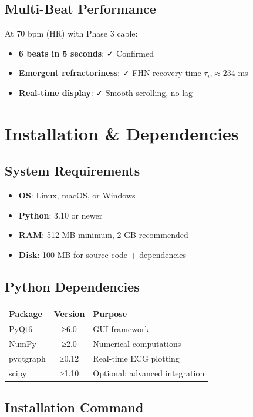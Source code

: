 \documentclass[11pt, a4paper]{article}
\begin{document}
\subsection{Multi-Beat Performance}

At 70 bpm (HR) with Phase 3 cable:
\begin{itemize}
    \item \textbf{6 beats in 5 seconds}: ✓ Confirmed
    \item \textbf{Emergent refractoriness}: ✓ FHN recovery time $\tau_w \approx 234$ ms
    \item \textbf{Real-time display}: ✓ Smooth scrolling, no lag
\end{itemize}

\section{Installation \& Dependencies}

\subsection{System Requirements}

\begin{itemize}
    \item \textbf{OS}: Linux, macOS, or Windows
    \item \textbf{Python}: 3.10 or newer
    \item \textbf{RAM}: 512 MB minimum, 2 GB recommended
    \item \textbf{Disk}: 100 MB for source code + dependencies
\end{itemize}

\subsection{Python Dependencies}

\begin{tabularx}{\textwidth}{|l|c|l|}
\hline
\textbf{Package} & \textbf{Version} & \textbf{Purpose} \\
\hline
PyQt6 & ≥6.0 & GUI framework \\
NumPy & ≥2.0 & Numerical computations \\
pyqtgraph & ≥0.12 & Real-time ECG plotting \\
scipy & ≥1.10 & Optional: advanced integration \\
\hline
\end{tabularx}

\subsection{Installation Command}
\end{document}
